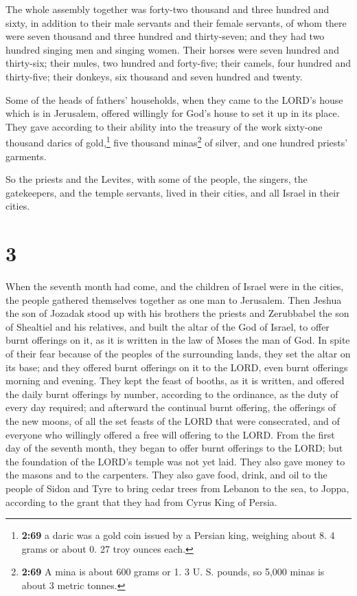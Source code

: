  The whole assembly together was forty-two thousand and
three hundred and sixty,  in addition to their male
servants and their female servants, of whom there were seven thousand
and three hundred and thirty-seven; and they had two hundred singing men
and singing women.  Their horses were seven hundred and
thirty-six; their mules, two hundred and forty-five; 
their camels, four hundred and thirty-five; their donkeys, six thousand
and seven hundred and twenty.

 Some of the heads of fathers' households, when they came
to the LORD's house which is in Jerusalem, offered willingly for God's
house to set it up in its place.  They gave according to
their ability into the treasury of the work sixty-one thousand darics of
gold,\footnote{\textbf{2:69} a daric was a gold coin issued by a Persian
  king, weighing about 8. 4 grams or about 0. 27 troy ounces each.} five
thousand minas\footnote{\textbf{2:69} A mina is about 600 grams or 1. 3
  U. S. pounds, so 5,000 minas is about 3 metric tonnes.} of silver, and
one hundred priests' garments.

 So the priests and the Levites, with some of the people,
the singers, the gatekeepers, and the temple servants, lived in their
cities, and all Israel in their cities.

\hypertarget{section-2}{%
\section{3}\label{section-2}}

 When the seventh month had come, and the children of
Israel were in the cities, the people gathered themselves together as
one man to Jerusalem.  Then Jeshua the son of Jozadak
stood up with his brothers the priests and Zerubbabel the son of
Shealtiel and his relatives, and built the altar of the God of Israel,
to offer burnt offerings on it, as it is written in the law of Moses the
man of God.  In spite of their fear because of the peoples
of the surrounding lands, they set the altar on its base; and they
offered burnt offerings on it to the LORD, even burnt offerings morning
and evening.  They kept the feast of booths, as it is
written, and offered the daily burnt offerings by number, according to
the ordinance, as the duty of every day required;  and
afterward the continual burnt offering, the offerings of the new moons,
of all the set feasts of the LORD that were consecrated, and of everyone
who willingly offered a free will offering to the LORD. 
From the first day of the seventh month, they began to offer burnt
offerings to the LORD; but the foundation of the LORD's temple was not
yet laid.  They also gave money to the masons and to the
carpenters. They also gave food, drink, and oil to the people of Sidon
and Tyre to bring cedar trees from Lebanon to the sea, to Joppa,
according to the grant that they had from Cyrus King of Persia.

